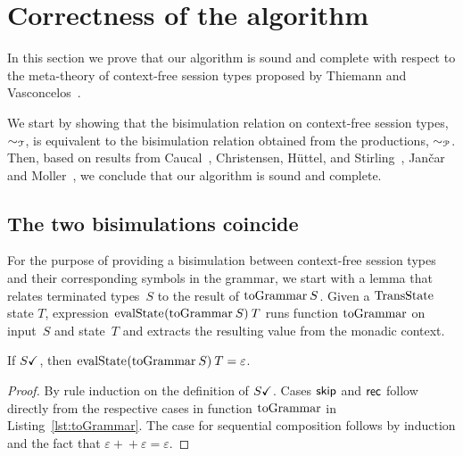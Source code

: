 \section{Correctness of the algorithm}
\label{sec:soundness}

In this section we prove that our algorithm is sound and complete
with respect to the meta-theory of context-free session types proposed
by Thiemann and Vasconcelos~\cite{thiemann2016context}.

We start by showing that the bisimulation relation on context-free
session types, $\sim_\mathcal T$, is equivalent to the bisimulation
relation obtained from the productions, $\sim_\mathcal P$.  Then, based on
results from Caucal~\cite{caucal1986decidabilite}, Christensen,
H{\"{u}}ttel, and Stirling~\cite{DBLP:journals/iandc/ChristensenHS95},
Jan{\v{c}}ar and Moller~\cite{janvcar1999techniques}, we conclude that
our algorithm is sound and complete.

\subsection{The two bisimulations coincide}

For the purpose of providing a bisimulation between context-free
session types and their corresponding symbols in the grammar, we start
with a lemma that relates terminated types~$S$ to the result of
$\toGrammarf S$.  Given a $\transStatek$ state $T$, expression
$\evalStatek (\toGrammarf S)\: T$ runs function $\toGrammark$ on
input~$S$ and state~$T$ and extracts the resulting value from the
monadic context.

\begin{lemma}
  \label{lem:terminated-togrammar}
  If $S\checkmark$, then $\evalStatek (\toGrammarf S)\: T=\varepsilon$.
\end{lemma}

\begin{proof}
  By rule induction on the definition of $S\checkmark$. Cases $\mathsf{skip}$ and
  $\mathsf{rec}$ follow directly from the respective cases in function
  $\toGrammark$ in Listing~\ref{lst:toGrammar}. The case for
  sequential composition follows by induction and the fact that
  $\varepsilon+\!\!+\varepsilon=\varepsilon$.
\end{proof}


